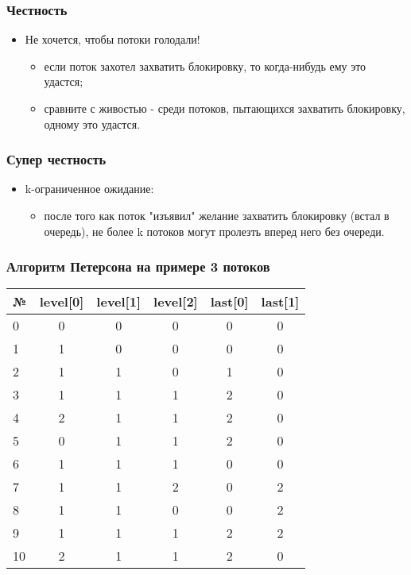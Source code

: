 \begin{frame}
\frametitle{Честность}
\begin{itemize}
    \item<1->Не хочется, чтобы потоки голодали!
    \begin{itemize}
        \item<2->если поток захотел захватить блокировку, то когда-нибудь
             ему это удастся;
        \item<3->сравните с живостью - среди потоков, пытающихся захватить
             блокировку, одному это удастся.
    \end{itemize}
\end{itemize}
\end{frame}

\begin{frame}
\frametitle{Супер честность}
\begin{itemize}
    \item<1->k-ограниченное ожидание:
    \begin{itemize}
        \item<2->после того как поток "изъявил" желание захватить блокировку
             (встал в очередь), не более k потоков могут пролезть вперед него
             без очереди.
    \end{itemize}
\end{itemize}
\end{frame}

\begin{frame}
\frametitle{Алгоритм Петерсона на примере 3 потоков}
\begin{table}
\begin{tabular}{l | c | c | c | c | c }
№ & level[0] & level[1] & level[2] & last[0] & last[1] \\
\hline\hline

0 & 0 & 0 & 0 & 0 & 0 \\
1 & 1 & 0 & 0 & 0 & 0 \\
2 & 1 & 1 & 0 & 1 & 0 \\
3 & 1 & 1 & 1 & 2 & 0 \\
4 & 2 & 1 & 1 & 2 & 0 \\
5 & 0 & 1 & 1 & 2 & 0 \\
6 & 1 & 1 & 1 & 0 & 0 \\
7 & 1 & 1 & 2 & 0 & 2 \\
8 & 1 & 1 & 0 & 0 & 2 \\
9 & 1 & 1 & 1 & 2 & 2 \\
10 & 2 & 1 & 1 & 2 & 0 \\

\hline
\end{tabular}
\end{table}
\end{frame}
